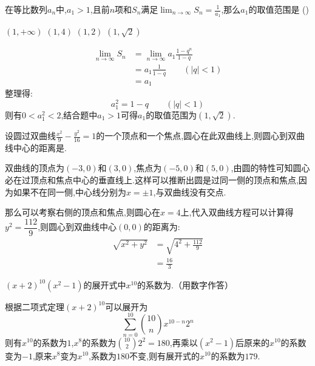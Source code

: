 \begin{questions}
	\question 在等比数列${a_n}$中,$a_1>1$,且前$n$项和$S_n$满足$\displaystyle
		\lim_{n\to\infty}S_n=\frac{1}{a_1}$,那么$a_1$的取值范围是 \hfill (\hspace{1cm})

	\begin{oneparchoices}
		\choice $(1,+\infty)$
		\choice $(1,4)$
		\choice $(1,2)$
		\CorrectChoice $(1,\sqrt{2})$
	\end{oneparchoices}

	\begin{solution}
		\begin{align*}
			\lim_{n\to\infty}S_n & = \lim_{n\to\infty}a_1\frac{1-q^n}{1-q} \\
			                     & = a_1\frac{1}{1-q}\qquad (|q|< 1)       \\
			                     & = a_1
		\end{align*}
		整理得:
		\begin{equation*}
			a_1^2 = 1 - q \qquad (|q|<1)
		\end{equation*}
		则有$0<a_1^2<2$,结合题中$a_1>1$可得$a_1$的取值范围为$(1,\sqrt{2})$.
	\end{solution}

	\question 设圆过双曲线$\frac{x^2}{9} -
		\frac{y^2}{16}=1$的一个顶点和一个焦点,圆心在此双曲线上,则圆心到双曲线中心的距离是\fillin[$\frac{16}{3}$][2cm].

	\begin{solution}
		双曲线的顶点为$(-3,0)$和$(3,0)$,焦点为$(-5,0)$和$(5,0)$,由圆的特性可知圆心必在过顶点和焦点中心的垂直线上.这样可以推断出圆是过同一侧的顶点和焦点,因为如果不在同一侧,中心线分别为$x=\pm1$,与双曲线没有交点.

		那么可以考察右侧的顶点和焦点,则圆心在$x=4$上,代入双曲线方程可以计算得$y^2=\dfrac{112}{9}$,则圆心到双曲线中心$(0,0)$的距离为:
		\begin{align*}
			\sqrt{x^2 + y^2} & = \sqrt{4^2 + \frac{112}{9}} \\
			                 & = \frac{16}{3}
		\end{align*}
	\end{solution}

	\question $(x+2)^{10}(x^2-1)$的展开式中$x^{10}$的系数为\fillin[179][2cm].（用数字作答）

	\begin{solution}
		根据二项式定理$(x+2)^{10}$可以展开为
		\begin{equation*}
			\sum_{n=0}^{10}\binom{10}{n}x^{10-n}2^{n}
		\end{equation*}
		则有$x^10$的系数为$1$,$x^8$的系数为$\binom{10}{2}2^2 =
			180$,再乘以$(x^2-1)$后原来的$x^{10}$的系数变为$-1$,原来$x^8$变为$x^{10}$,系数为$180$不变,则有展开式的$x^{10}$的系数为$179$.
	\end{solution}


\end{questions}
